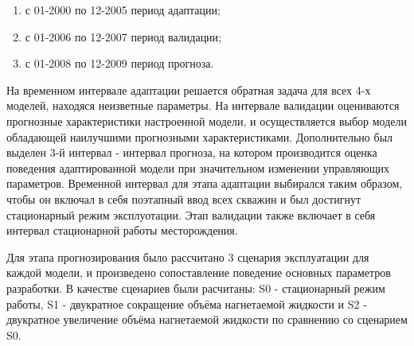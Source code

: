 \documentclass{article}
\begin{document}
\begin{enumerate}
\item с 01-2000 по 12-2005  период адаптации;
\item с 01-2006 по 12-2007  период валидации;
\item с 01-2008 по 12-2009  период прогноза.
\end{enumerate}
На временном интервале адаптации решается обратная задача для всех 4-х моделей, находяся неизветные параметры. На интервале валидации оцениваются прогнозные характеристики настроенной модели, и осуществляется выбор модели обладающей наилучшими прогнозными характеристиками. Дополнительно был выделен 3-й интервал - интервал прогноза, на котором производится оценка поведения адаптированной модели при значительном изменении управляющих параметров. Временной интервал для этапа адаптации  выбирался таким образом, чтобы он включал в себя поэтапный ввод всех скважин и был достигнут стационарный режим эксплуотации. Этап валидации также включает в себя интервал стационарной работы месторождения. 

Для этапа прогнозирования было рассчитано 3 сценария эксплуатации для каждой модели, и произведено сопоставление поведение основных параметров разработки. В качестве сценариев были расчитаны: S0 - стационарный режим работы, S1 - двукратное сокращение объёма нагнетаемой жидкости и S2 - двукратное увеличение объёма нагнетаемой жидкости по сравнению со сценарием S0. 
\end{document}
